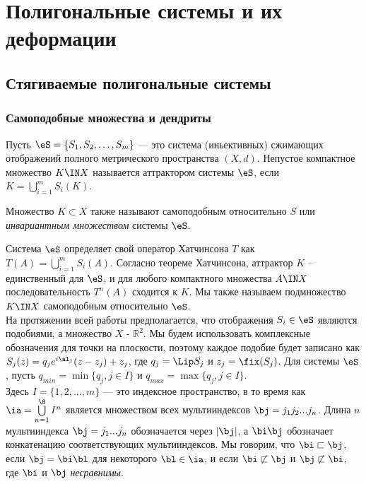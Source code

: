 
\chapter[Полигональные системы и их деформации]
    {Полигональные системы и их деформации}


\section[Стягиваемые полигональные системы]
    {Стягиваемые полигональные системы}


\subsection{Самоподобные множества и дендриты}

\begin{definition} 
Пусть $\eS=\{S_1, S_2, \ldots, S_m\}$ --- это система (иньективных) сжимающих отображений полного метрического пространства $(X, d)$.
Непустое компактное множество $K\IN X$ называется аттрактором системы $\eS$, если $K = \bigcup \limits_{i = 1}^m S_i (K)$.
\end{definition}

Множество $K\subset X$ также называют самоподобным относительно $S$ или {\em инвариантным множеством}  системы $\eS$.
 
Система $\eS$ определяет свой оператор Хатчинсона $T$  как  $T(A) = \bigcup \limits_{i = 1}^m S_i (A)$.
Согласно теореме Хатчинсона, аттрактор $K$ -- единственный для $\eS$, и для любого компактного множества $A\IN X$ последовательность $T^n (A)$ сходится к $K$.
Мы также называем подмножество $K\IN X $ самоподобным относительно $\eS$.\\
На протяжении всей работы предполагается, что отображения $S_i\in \eS$ являются подобиями, а множество $X$ - $\mathbb{R}^2$.
Мы будем использовать комплексные обозначения для точки на плоскости, поэтому каждое подобие будет записано как $S_j(z)=q_je^{i\al_j}(z-z_j)+z_j$, где $q_j=\Lip S_j$ и $z_j=\fix(S_j)$.
Для системы $\eS$, пусть $q_{min}=\min\{q_j,j\in I\}$ и $q_{max}=\max\{q_j,j\in I\}$.\\
Здесь $I=\{1,2,...,m\}$ --- это индексное пространство, в то время как $\ia=\bigcup\limits_{n=1}^\8 I^n$ является множеством всех мультииндексов $\bj=j_1j_2...j_n$.
Длина $n$ мультииндекса $\bj=j_1...j_n$ обозначается через  $|\bj|$, а $\bi\bj$  обозначает конкатенацию соответствующих мультииндексов.
Мы говорим, что $\bi\sqsubset\bj$, если  $\bj=\bi\bl$ для некоторого $\bl\in\ia$, и если $\bi\not\sqsubset\bj$ и $\bj\not\sqsubset\bi$, где $\bi$ и $\bj$ {\em несравнимы}.\\

